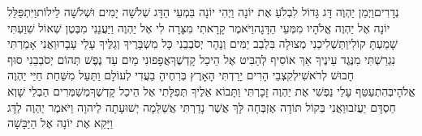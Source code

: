 \documentclass[../main/main.tex]{subfiles}
\begin{document}
\begin{multicols*}{\ncols}
נְדָרִים\PreChapterSpace{}וַיְמַן יַהְוֶה דָּג גָּדוֹל לִבְלֹעַ אֶת יוֹנָה וַיְהִי יוֹנָה בִּמְעֵי הַדָּג שְׁלֹשָׁה יָמִים וּשְׁלֹשָׁה לֵילוֹת\PreVerseSpace{}וַיִּתְפַּלֵּל יוֹנָה אֶל יַהְוֶה אֱלֹהָיו מִמְּעֵי הַדָּגָה\PreVerseSpace{}וַיֹּאמֶר קָרָאתִי מִצָּרָה לִי אֶל יַהְוֶה וַיַּעֲנֵנִי מִבֶּטֶן שְׁאוֹל שִׁוַּעְתִּי שָׁמַעְתָּ קוֹלִי\PreVerseSpace{}וַתַּשְׁלִיכֵנִי מְצוּלָה בִּלְבַב יַמִּים וְנָהָר יְסֹבְבֵנִי כָּל מִשְׁבָּרֶיךָ וְגַלֶּיךָ עָלַי עָבָרוּ\PreVerseSpace{}וַאֲנִי אָמַרְתִּי נִגְרַשְׁתִּי מִנֶּגֶד עֵינֶיךָ אֵךְ\SubEnd{} אוֹסִיף לְהַבִּיט אֶל הֵיכַל קָדְשֶׁךָ\PreVerseSpace{}אֲפָפוּנִי מַיִם עַד נֶפֶשׁ תְּהוֹם יְסֹבְבֵנִי סוּף חָבוּשׁ לְרֹאשִׁי\PreVerseSpace{}לְקִצְבֵי הָרִים יָרַדְתִּי הָאָרֶץ בְּרִחֶיהָ בַעֲדִי לְעוֹלָם וַתַּעַל מִשַּׁחַת חַיַּי יַהְוֶה אֱלֹהָי\PreVerseSpace{}בְּהִתְעַטֵּף עָלַי נַפְשִׁי אֶת יַהְוֶה זָכָרְתִּי וַתָּבוֹא אֵלֶיךָ תְּפִלָּתִי אֶל הֵיכַל קָדְשֶׁךָ\PreVerseSpace{}מְשַׁמְּרִים הַבְלֵי שָׁוְא חַסְדָּם יַעֲזֹבוּ\PreVerseSpace{}וַאֲנִי בְּקוֹל תּוֹדָה אֶזְבְּחָה לָּךְ אֲשֶׁר נָדַרְתִּי אֲשַׁלֵּמָה יְשׁוּעָתָה לַיהוָה \ClosedSection{}וַיֹּאמֶר יַהְוֶה לַדָּג וַיָּקֵא אֶת יוֹנָה אֶל הַיַּבָּשָׁה\OpenSection{}\par

\end{multicols*}
\end{document}

